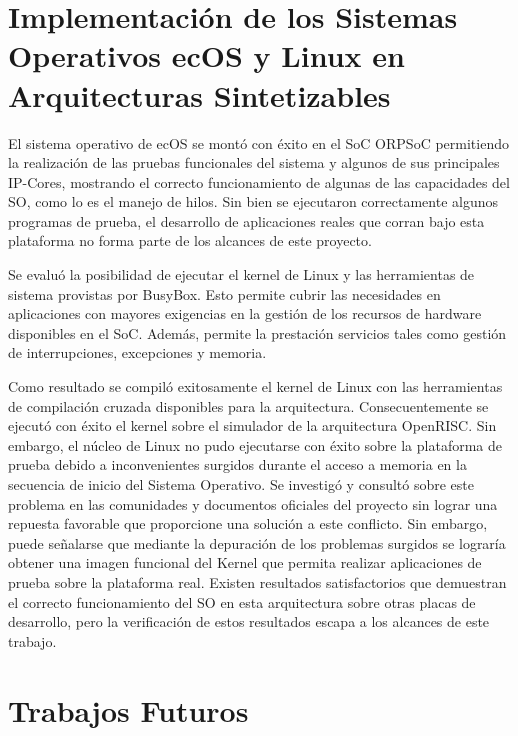 \section{Implementación de los Sistemas Operativos ecOS y Linux en Arquitecturas Sintetizables}

El sistema operativo de ecOS se montó con éxito en el SoC ORPSoC permitiendo la realización de las pruebas funcionales del
sistema y algunos de sus principales IP-Cores, mostrando el correcto funcionamiento de algunas de las capacidades del SO, como lo es el manejo de
hilos. Sin bien se ejecutaron correctamente algunos programas de prueba, el desarrollo de aplicaciones reales que corran bajo esta plataforma no forma
parte de los alcances de este proyecto.

Se evaluó la posibilidad de ejecutar el kernel de Linux y las herramientas de sistema provistas por BusyBox. Esto permite cubrir las necesidades en
aplicaciones con mayores exigencias en la gestión de los recursos de hardware disponibles en el SoC. Además, permite la prestación servicios tales
como gestión de interrupciones, excepciones y memoria.
 
Como resultado se compiló exitosamente el kernel de Linux con las herramientas de compilación cruzada disponibles para la arquitectura.
Consecuentemente se ejecutó con éxito el kernel sobre el simulador de la arquitectura OpenRISC. Sin embargo, el núcleo de Linux no pudo ejecutarse
con éxito sobre la plataforma de prueba debido a inconvenientes surgidos durante el acceso a memoria en la secuencia de inicio del Sistema Operativo.
Se investigó y consultó sobre este problema en las comunidades y documentos oficiales del proyecto sin lograr una repuesta favorable que proporcione
una solución a este conflicto. Sin embargo, puede señalarse que mediante la depuración de los problemas surgidos se lograría obtener una imagen
funcional del Kernel que permita realizar aplicaciones de prueba sobre la plataforma real. Existen resultados satisfactorios que demuestran el correcto
funcionamiento del SO en esta arquitectura sobre otras placas de desarrollo, pero la verificación de estos resultados escapa a los alcances de este
trabajo.

\section{Trabajos Futuros}


